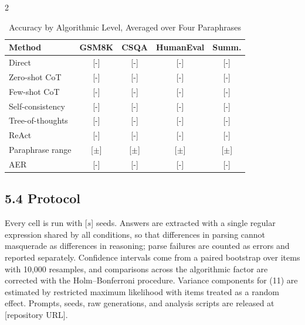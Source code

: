 \documentclass{article}
\begin{document}
\begin{multicols}{2}

\begin{table}[H]
\caption{Accuracy by Algorithmic Level, Averaged over Four Paraphrases}
\centering
\small
\begin{tabular}{lcccc}
\toprule
\textbf{Method} & \textbf{GSM8K} & \textbf{CSQA} & \textbf{HumanEval} & \textbf{Summ.} \\
\midrule
Direct & \textcolor{BrickRed}{[-]} & \textcolor{BrickRed}{[-]} & \textcolor{BrickRed}{[-]} & \textcolor{BrickRed}{[-]} \\
Zero-shot CoT & \textcolor{BrickRed}{[-]} & \textcolor{BrickRed}{[-]} & \textcolor{BrickRed}{[-]} & \textcolor{BrickRed}{[-]} \\
Few-shot CoT & \textcolor{BrickRed}{[-]} & \textcolor{BrickRed}{[-]} & \textcolor{BrickRed}{[-]} & \textcolor{BrickRed}{[-]} \\
Self-consistency & \textcolor{BrickRed}{[-]} & \textcolor{BrickRed}{[-]} & \textcolor{BrickRed}{[-]} & \textcolor{BrickRed}{[-]} \\
Tree-of-thoughts & \textcolor{BrickRed}{[-]} & \textcolor{BrickRed}{[-]} & \textcolor{BrickRed}{[-]} & \textcolor{BrickRed}{[-]} \\
ReAct & \textcolor{BrickRed}{[-]} & \textcolor{BrickRed}{[-]} & \textcolor{BrickRed}{[-]} & \textcolor{BrickRed}{[-]} \\
\midrule
Paraphrase range & \textcolor{BrickRed}{[$\pm$]} & \textcolor{BrickRed}{[$\pm$]} & \textcolor{BrickRed}{[$\pm$]} & \textcolor{BrickRed}{[$\pm$]} \\
AER & \textcolor{BrickRed}{[-]} & \textcolor{BrickRed}{[-]} & \textcolor{BrickRed}{[-]} & \textcolor{BrickRed}{[-]} \\
\bottomrule
\end{tabular}
\end{table}

\subsection{5.4 Protocol}

Every cell is run with \textcolor{BrickRed}{[$s$]} seeds. Answers are extracted with a single regular expression shared by all conditions, so that differences in parsing cannot masquerade as differences in reasoning; parse failures are counted as errors and reported separately. Confidence intervals come from a paired bootstrap over items with 10,000 resamples, and comparisons across the algorithmic factor are corrected with the Holm--Bonferroni procedure. Variance components for (11) are estimated by restricted maximum likelihood with items treated as a random effect. Prompts, seeds, raw generations, and analysis scripts are released at \textcolor{BrickRed}{[repository URL]}.


\end{multicols}
\end{document}
